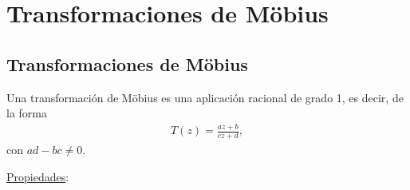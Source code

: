 \chapter{Transformaciones de M\"obius}

\section{Transformaciones de M\"obius}
\begin{defi}
    Una transformación de M\"obius es una aplicación racional de grado 1, es decir, de la forma
    \begin{align*}
        T(z) = \frac{az + b}{cz + d},
    \end{align*}
    con $ad - bc \not = 0$.
\end{defi}

\underline{Propiedades}:

